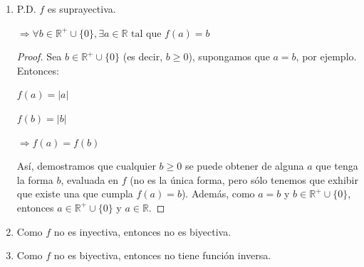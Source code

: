 \documentclass{article}
\begin{document}
\begin{enumerate}
\begin{enumerate}
\begin{enumerate}
\begin{proof}
\begin{multicols}{2}
                \(f(b)=|1|=1\)
                \vspace{\baselineskip}
                
                \(\Rightarrow f(a)=f(b)\)
                \columnbreak
                
                \(a = 1 \land b = -1\)
                \vspace{\baselineskip}
                
                \(\Rightarrow a \neq b\)
            \end{multicols}

            Así, \(f\) no es inyectiva.
            
            \end{proof}
            \item[2.] P.D. \(f\) es suprayectiva.
            
            \(\Rightarrow \forall b \in \mathbb{R}^+ \cup \{0\}, \exists a \in \mathbb{R} \text{ tal que } f(a) = b\)
            \vspace{\baselineskip}
            
            \begin{proof} Sea \(b \in \mathbb{R}^+ \cup \{0\}\) (es decir, \(b \geq 0\)), supongamos que \(a = b\), por ejemplo. Entonces:
            
            \(f(a) = \lvert a \rvert\)
            
            \(f(b) = \lvert b \rvert\)
            \vspace{\baselineskip}
            
            \(\Rightarrow f(a) = f(b)\)
            
            Así, demostramos que cualquier \(b \geq 0\) se puede obtener de alguna \(a\) que tenga la forma \(b\), evaluada en \(f\) (no es la única forma, pero sólo tenemos que exhibir que existe una que cumpla \(f(a) = b\)). Además, como \(a = b\) y \(b \in \mathbb{R}^+ \cup \{0\}\), entonces \(a \in \mathbb{R}^+ \cup \{0\}\) y \(a \in \mathbb{R}\).
            
            \end{proof}
            \item[3.] Como \(f\) no es inyectiva, entonces no es biyectiva.
            \item[4.] Como \(f\) no es biyectiva, entonces no tiene función inversa.
        \end{enumerate}
        \vspace{\baselineskip}
        

\end{enumerate}
\end{enumerate}
\end{document}
